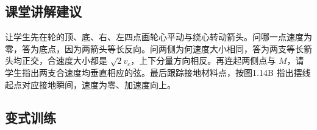 \documentclass[UTF8,fontset=fandol,a4paper,11pt]{ctexart}
\begin{document}


\subsection*{课堂讲解建议}

让学生先在轮的顶、底、右、左四点画轮心平动与绕心转动箭头。问哪一点速度为零，答为底点，因为两箭头等长反向。问两侧为何速度大小相同，答为两支等长箭头均正交，合速度大小都是 $\sqrt2v_c$，上下分量方向相反。再连起两侧点与 $M$，请学生指出两支合速度均垂直相应的弦。最后跟踪接地材料点，按图1.14B 指出摆线起点对应接地瞬间，速度为零、加速度向上。



\subsection*{变式训练}
\end{document}
